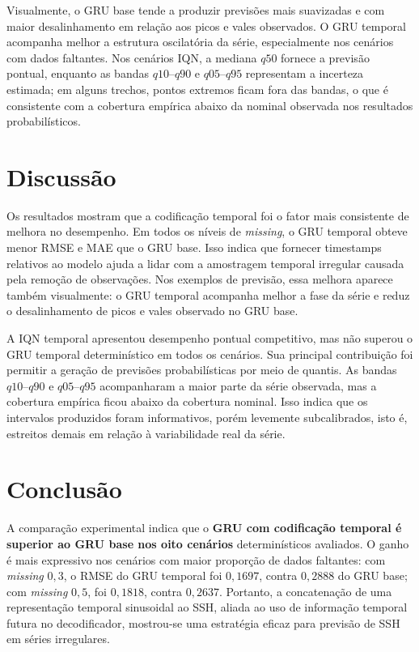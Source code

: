 \documentclass[a4paper,11pt]{article}
\begin{document}
Visualmente, o GRU base tende a produzir previsões mais suavizadas e com maior
desalinhamento em relação aos picos e vales observados. O GRU temporal acompanha
melhor a estrutura oscilatória da série, especialmente nos cenários com dados
faltantes. Nos cenários IQN, a mediana $q50$ fornece a previsão pontual, enquanto
as bandas $q10$--$q90$ e $q05$--$q95$ representam a incerteza estimada; em alguns
trechos, pontos extremos ficam fora das bandas, o que é consistente com a
cobertura empírica abaixo da nominal observada nos resultados probabilísticos.


\section{Discussão} Os resultados mostram que a codificação temporal foi o fator mais consistente de melhora no desempenho. Em todos os níveis de \textit{missing}, o GRU temporal obteve menor RMSE e MAE que o GRU base. Isso indica que fornecer timestamps relativos ao modelo ajuda a lidar com a amostragem temporal irregular causada pela remoção de observações. Nos exemplos de previsão, essa melhora aparece também visualmente: o GRU temporal acompanha melhor a fase da série e reduz o desalinhamento de picos e vales observado no GRU base.

A IQN temporal apresentou desempenho pontual competitivo, mas não superou o GRU temporal determinístico em todos os cenários. Sua principal contribuição foi permitir a geração de previsões probabilísticas por meio de quantis. As bandas $q10$--$q90$ e $q05$--$q95$ acompanharam a maior parte da série observada, mas a cobertura empírica ficou abaixo da cobertura nominal. Isso indica que os intervalos produzidos foram informativos, porém levemente subcalibrados, isto é, estreitos demais em relação à variabilidade real da série.

\section{Conclusão}

    A comparação experimental indica que o\textbf{ GRU com codificação temporal é superior
    ao GRU base nos oito cenários} determinísticos avaliados. O ganho é mais
expressivo nos cenários com maior proporção de dados faltantes: com
\textit{missing} $0{,}3$, o RMSE do GRU temporal foi $0{,}1697$, contra
$0{,}2888$ do GRU base; com \textit{missing} $0{,}5$, foi $0{,}1818$, contra
$0{,}2637$. Portanto, a concatenação de uma representação temporal sinusoidal ao
SSH, aliada ao uso de informação temporal futura no decodificador, mostrou-se
uma estratégia eficaz para previsão de SSH em séries irregulares.
\end{document}
